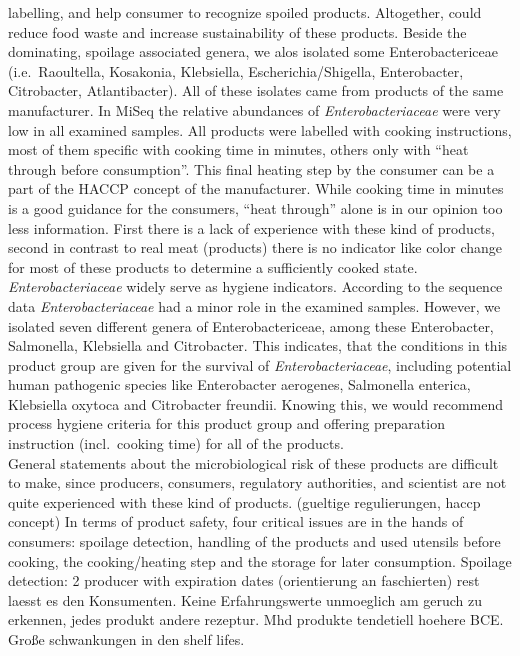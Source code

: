 \documentclass[preprint, 3p,
authoryear]{elsarticle} %
\begin{document}
labelling, and help consumer to recognize spoiled products. Altogether,
could reduce food waste and increase sustainability of these products.
Beside the dominating, spoilage associated genera, we alos isolated some
Enterobactericeae (i.e.~Raoultella, Kosakonia, Klebsiella,
Escherichia/Shigella, Enterobacter, Citrobacter, Atlantibacter). All of
these isolates came from products of the same manufacturer. In MiSeq the
relative abundances of \emph{Enterobacteriaceae} were very low in all
examined samples. All products were labelled with cooking instructions,
most of them specific with cooking time in minutes, others only with
``heat through before consumption''. This final heating step by the
consumer can be a part of the HACCP concept of the manufacturer. While
cooking time in minutes is a good guidance for the consumers, ``heat
through'' alone is in our opinion too less information. First there is a
lack of experience with these kind of products, second in contrast to
real meat (products) there is no indicator like color change for most of
these products to determine a sufficiently cooked state.
\emph{Enterobacteriaceae} widely serve as hygiene indicators. According
to the sequence data \emph{Enterobacteriaceae} had a minor role in the
examined samples. However, we isolated seven different genera of
Enterobactericeae, among these Enterobacter, Salmonella, Klebsiella and
Citrobacter. This indicates, that the conditions in this product group
are given for the survival of \emph{Enterobacteriaceae}, including
potential human pathogenic species like Enterobacter aerogenes,
Salmonella enterica, Klebsiella oxytoca and Citrobacter freundii.
Knowing this, we would recommend process hygiene criteria for this
product group and offering preparation instruction (incl.~cooking time)
for all of the products.\\
General statements about the microbiological risk of these products are
difficult to make, since producers, consumers, regulatory authorities,
and scientist are not quite experienced with these kind of products.
(gueltige regulierungen, haccp concept) In terms of product safety, four
critical issues are in the hands of consumers: spoilage detection,
handling of the products and used utensils before cooking, the
cooking/heating step and the storage for later consumption. Spoilage
detection: 2 producer with expiration dates (orientierung an
faschierten) rest laesst es den Konsumenten. Keine Erfahrungswerte
unmoeglich am geruch zu erkennen, jedes produkt andere rezeptur. Mhd
produkte tendetiell hoehere BCE. Große schwankungen in den shelf lifes.
\end{document}
